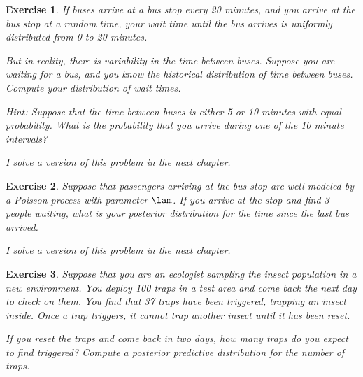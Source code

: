 \documentclass[12pt]{book}
\theoremstyle{exercise}
\newtheorem{exercise}{Exercise}[chapter]
\begin{document}
\begin{exercise}

If buses arrive at a bus stop every 20 minutes, and you
arrive at the bus stop at a random time, your wait time until
the bus arrives is uniformly distributed from 0 to 20 minutes.

But in reality, there is variability in the time between
buses.  Suppose you are waiting for a bus, and you know the historical
distribution of time between buses.  Compute your distribution
of wait times.

Hint: Suppose that the time between buses is either
5 or 10 minutes with equal probability.  What is the probability
that you arrive during one of the 10 minute intervals?

I solve a version of this problem in the next chapter.

\end{exercise}


\begin{exercise}

Suppose that passengers arriving at the bus stop are well-modeled
by a Poisson process with parameter $\lam$.  If you arrive at the
stop and find 3 people waiting, what is your posterior distribution
for the time since the last bus arrived.

I solve a version of this problem in the next chapter.

\end{exercise}


\begin{exercise}

Suppose that you are an ecologist sampling the insect population in
a new environment.  You deploy 100 traps in a test area and come back
the next day to check on them.  You find that 37 traps have been
triggered, trapping an insect inside.  Once a trap triggers, it
cannot trap another insect until it has been reset.

If you reset the traps and come back in two days, how many traps
do you expect to find triggered?  Compute a posterior predictive
distribution for the number of traps.

\end{exercise}
\end{document}
